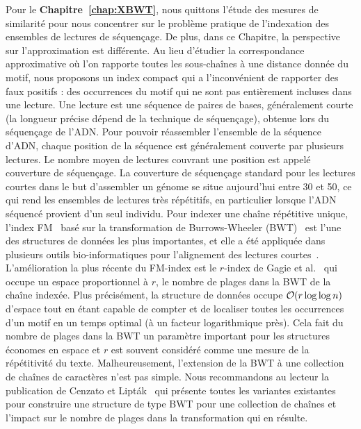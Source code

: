Pour le \textbf{Chapitre~\ref{chap:XBWT}}, nous quittons l'étude des mesures de similarité pour nous concentrer sur le problème pratique de l'indexation des ensembles de lectures de séquençage. 
De plus, dans ce Chapitre, la perspective sur l'approximation est différente. Au lieu d'étudier la correspondance approximative où l'on rapporte toutes les sous-chaînes à une distance donnée du motif, nous proposons un index compact qui a l'inconvénient de rapporter des faux positifs : des occurrences du motif qui ne sont pas entièrement incluses dans une lecture.
%
Une lecture est une séquence de paires de bases, généralement courte (la longueur précise dépend de la technique de séquençage), obtenue lors du séquençage de l'ADN. Pour pouvoir réassembler l'ensemble de la séquence d'ADN, chaque position de la séquence est généralement couverte par plusieurs lectures. Le nombre moyen de lectures couvrant une position est appelé couverture de séquençage.
La couverture de séquençage standard pour les lectures courtes dans le but d'assembler un génome se situe aujourd'hui entre 30 et 50, ce qui rend les ensembles de lectures très répétitifs, en particulier lorsque l'ADN séquencé provient d'un seul individu.
%
Pour indexer une chaîne répétitive unique, l'index FM~\cite{ferragina2005indexing} basé sur la transformation de Burrows-Wheeler (BWT)~\cite{burrows1994block} est l'une des structures de données les plus importantes, et elle a été appliquée dans plusieurs outils bio-informatiques pour l'alignement des lectures courtes~\cite{langmead2009ultrafast,langmead2012fast,li2009fast}.
%
L'amélioration la plus récente du FM-index est le $r$-index de Gagie et al.~\cite{gagie2020fully} qui occupe un espace proportionnel à $r$, le nombre de plages dans la BWT de la chaîne indexée. Plus précisément, la structure de données occupe $\mathcal{O}(r\log\log n)$ d'espace tout en étant capable de compter et de localiser toutes les occurrences d'un motif en un temps optimal (à un facteur logarithmique près). Cela fait du nombre de plages dans la BWT un paramètre important pour les structures économes en espace et $r$ est souvent considéré comme une mesure de la répétitivité du texte.
%
Malheureusement, l'extension de la BWT à une collection de chaînes de caractères n'est pas simple. Nous recommandons au lecteur la publication de Cenzato et Lipták~\cite{cenzato_et_al_BWT_Collections} qui présente toutes les variantes existantes pour construire une structure de type BWT pour une collection de chaînes et l'impact sur le nombre de plages dans la transformation qui en résulte.


